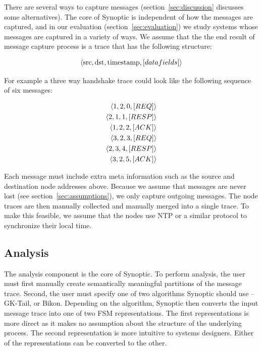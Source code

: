 There are several ways to capture messages
(section~\ref{sec:discussion} discusses some alternatives). The core
of Synoptic is independent of how the messages are captured, and in
our evaluation (section~\ref{sec:evaluation}) we study systems whose
messages are captured in a variety of ways. We assume that the the end
result of message capture process is a trace that has the following
structure:

\begin{align*}
\left<\textup{src}, \textup{dst}, \textup{timestamp}, \left[datafields\right]\right>
\end{align*}

For example a three way handshake trace could look like the following
sequence of six messages:

\begin{align*}
\left<\textup{1}, \textup{2}, \textup{0}, \left[REQ\right]\right>\\
\left<\textup{2}, \textup{1}, \textup{1}, \left[RESP\right]\right>\\
\left<\textup{1}, \textup{2}, \textup{2},  \left[ACK\right]\right>\\
\left<\textup{3}, \textup{2}, \textup{3}, \left[REQ\right]\right>\\
\left<\textup{2}, \textup{3}, \textup{4}, \left[RESP\right]\right>\\
\left<\textup{3}, \textup{2}, \textup{5},  \left[ACK\right]\right>
\end{align*}

Each message must include extra meta information such as the source
and destination node addresses above. Because we assume that messages
are never lost (see section~\ref{sec:assumptions}), we only capture
outgoing messages. The node traces are then manually collected and
manually merged into a single trace. To make this feasible, we assume
that the nodes use NTP or a similar protocol to synchronize their
local time.

\subsection{Analysis}

The analysis component is the core of Synoptic. To perform analysis,
the user must first manually create semantically meaningful partitions
of the message trace. Second, the user must specify one of two
algorithms Synoptic should use -- GK-Tail, or Bikon. Depending on the
algorithm, Synoptic then converts the input message trace into one of
two FSM representations. The first representations is more direct as
it makes no assumption about the structure of the underlying
process. The second representation is more intuitive to systems
designers. Either of the representations can be converted to the
other.

